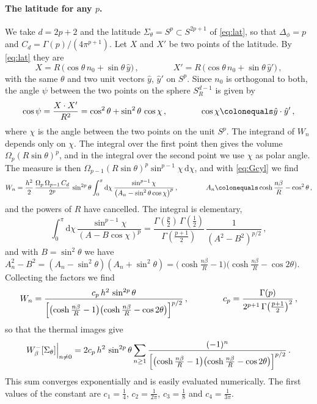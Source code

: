 \documentclass[a4paper,11pt]{article}
\newcommand{\dd}{\mathrm{d}}
\begin{document}
	\paragraph{The latitude for any $p$.}
	We take $d=2p+2$ and the latitude $\Sigma_\theta=S^p\subset S^{2p+1}$ of \eqref{eq:lat}, so that $\Delta_\phi=p$ and $C_d=\Gamma(p)/(4\pi^{p+1})$. Let $X$ and $X'$ be two points of the latitude. By \eqref{eq:lat} they are
	\begin{equation}
		X=R\,\bigl(\cos\theta\,n_0+\sin\theta\,\hat y\bigr)\, ,\qquad\qquad X'=R\,\bigl(\cos\theta\,n_0+\sin\theta\,\hat y'\bigr)\, ,
	\end{equation}
	with the same $\theta$ and two unit vectors $\hat y$, $\hat y'$ on $S^p$. Since $n_0$ is orthogonal to both, the angle $\psi$ between the two points on the sphere $S^{d-1}_R$ is given by
	\begin{equation}
		\cos\psi=\frac{X\cdot X'}{R^2}=\cos^2\theta+\sin^2\theta\,\cos\chi\, ,\qquad\qquad \cos\chi\colonequals\hat y\cdot\hat y'\, ,
	\end{equation}
	where $\chi$ is the angle between the two points on the unit $S^p$. The integrand of $W_n$ depends only on $\chi$. The integral over the first point then gives the volume $\Omega_p(R\sin\theta)^p$, and in the integral over the second point we use $\chi$ as polar angle. The measure is then $\Omega_{p-1}(R\sin\theta)^p\sin^{p-1}\chi\,\dd\chi$, and with \eqref{eq:Gcyl} we find
	\begin{equation}\label{eq:WnscalarLat}
		W_n=\frac{h^2}{2}\,\frac{\Omega_p\,\Omega_{p-1}\,C_d}{2^p}\,\sin^{2p}\theta\int_0^\pi\dd\chi\,\frac{\sin^{p-1}\chi}{\bigl(A_n-\sin^2\theta\cos\chi\bigr)^p}\, ,\qquad\qquad A_n\colonequals\cosh\frac{n\beta}{R}-\cos^2\theta\, ,
	\end{equation}
	and the powers of $R$ have cancelled. The integral is elementary,
	\begin{equation}
		\int_0^\pi\dd\chi\,\frac{\sin^{p-1}\chi}{(A-B\cos\chi)^{p}}=\frac{\Gamma(\frac p2)\,\Gamma(\frac12)}{\Gamma(\frac{p+1}{2})}\,\frac{1}{(A^2-B^2)^{p/2}}\, ,
	\end{equation}
	and with $B=\sin^2\theta$ we have $A_n^2-B^2=(A_n-\sin^2\theta)(A_n+\sin^2\theta)=\bigl(\cosh\tfrac{n\beta}{R}-1\bigr)\bigl(\cosh\tfrac{n\beta}{R}-\cos2\theta\bigr)$. Collecting the factors we find
	\begin{equation}\label{eq:anypWn}
		W_n=\frac{c_p\,h^2\,\sin^{2p}\theta}{\Bigl[\bigl(\cosh\frac{n\beta}{R}-1\bigr)\bigl(\cosh\frac{n\beta}{R}-\cos2\theta\bigr)\Bigr]^{p/2}}\, ,\qquad\qquad
		c_p=\frac{\Gamma(p)}{2^{p+1}\,\Gamma\bigl(\frac{p+1}{2}\bigr)^2}\, ,
	\end{equation}
	so that the thermal images give
	\begin{equation}\label{eq:anypsum}
		W^-_\beta[\Sigma_\theta]\Big|_{n\neq0}=2c_p\,h^2\,\sin^{2p}\theta\sum_{n\ge1}\frac{(-1)^n}{\Bigl[\bigl(\cosh\frac{n\beta}{R}-1\bigr)\bigl(\cosh\frac{n\beta}{R}-\cos2\theta\bigr)\Bigr]^{p/2}}\, .
	\end{equation}
	This sum converges exponentially and is easily evaluated numerically. The first values of the constant are $c_1=\tfrac14$, $c_2=\tfrac1{2\pi}$, $c_3=\tfrac18$ and $c_4=\tfrac{1}{3\pi}$.
	
\end{document}
